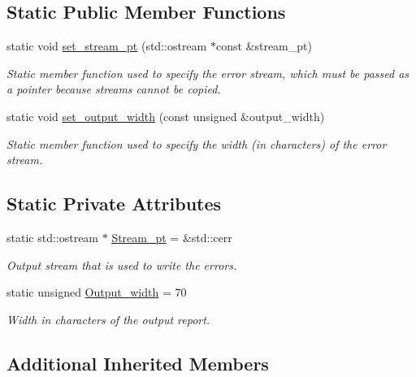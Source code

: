 \subsection*{Static Public Member Functions}
\begin{DoxyCompactItemize}
\item 
static void \hyperlink{classoomph_1_1OomphLibError_a64f1bfd5eaaafdef448c9a9f47be85cb}{set\+\_\+stream\+\_\+pt} (std\+::ostream $\ast$const \&stream\+\_\+pt)
\begin{DoxyCompactList}\small\item\em Static member function used to specify the error stream, which must be passed as a pointer because streams cannot be copied. \end{DoxyCompactList}\item 
static void \hyperlink{classoomph_1_1OomphLibError_a9c1f4842949a5938f2646428cb390124}{set\+\_\+output\+\_\+width} (const unsigned \&output\+\_\+width)
\begin{DoxyCompactList}\small\item\em Static member function used to specify the width (in characters) of the error stream. \end{DoxyCompactList}\end{DoxyCompactItemize}
\subsection*{Static Private Attributes}
\begin{DoxyCompactItemize}
\item 
static std\+::ostream $\ast$ \hyperlink{classoomph_1_1OomphLibError_a8a2076201ede98a0c72b94a713052b46}{Stream\+\_\+pt} = \&std\+::cerr
\begin{DoxyCompactList}\small\item\em Output stream that is used to write the errors. \end{DoxyCompactList}\item 
static unsigned \hyperlink{classoomph_1_1OomphLibError_a4f0a51dc7d73673d9cb17f3f4f9cd904}{Output\+\_\+width} = 70
\begin{DoxyCompactList}\small\item\em Width in characters of the output report. \end{DoxyCompactList}\end{DoxyCompactItemize}
\subsection*{Additional Inherited Members}


